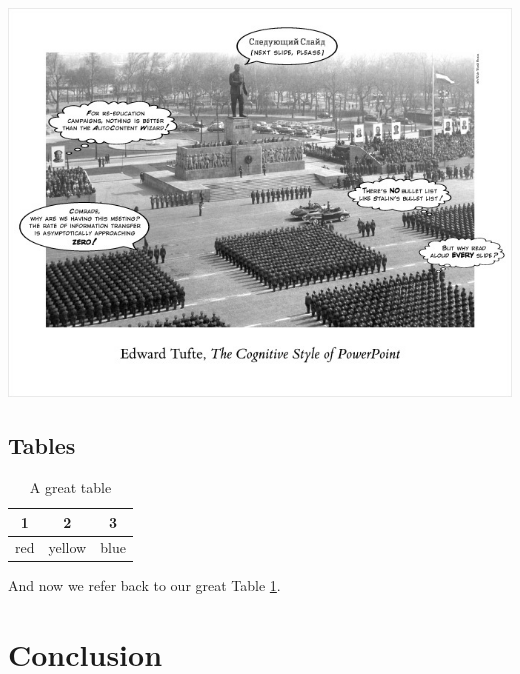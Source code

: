 \documentclass[]{article}
\begin{document}
\includegraphics{../Figs/home_stalin_poster}


\subsection{Tables}

\begin{table}
	\caption{A great table}
	\label{tab: greattable}
	\centering
\begin{tabular}{ccc}
	\hline  
	1 & 2  & 3 \\ 
	\hline  
	red & yellow  & blue \\ 
	\hline 
\end{tabular} 
\end{table}

And now we refer back to our great Table \ref{tab: greattable}.


\section{Conclusion}

%


\end{document}
